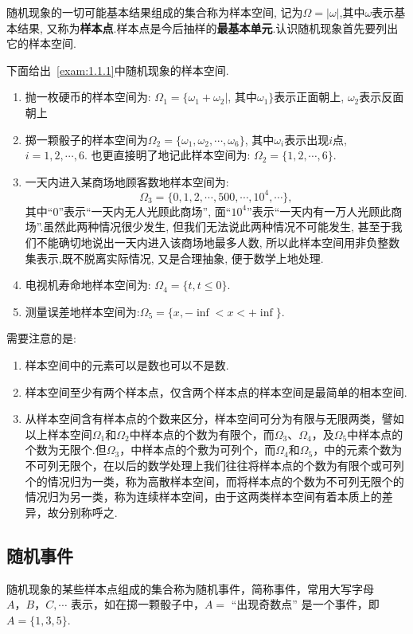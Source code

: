 随机现象的一切可能基本结果组成的集合称为样本空间, 记为$\Omega=|\omega|$,其中$\omega$表示基本结果, 又称为\textbf{样本点}.样本点是今后抽样的\textbf{最基本单元}.认识随机现象首先要列出它的样本空间.
	
\begin{example}
	
	下面给出~\ref{exam:1.1.1}中随机现象的样本空间.
	\begin{enumerate}
		\item 抛一枚硬币的样本空间为: $\Omega_1=\{\omega_{1}+\omega_{2}|$, 其中$\omega_{1}\}$表示正面朝上, $\omega_{2}$表示反面朝上
		\item 掷一颗骰子的样本空间为$ \Omega_{2}=\{\omega_{1},\omega_{2},\cdots,\omega_{6}\} $, 其中$ \omega_{i} $表示出现$ i $点, $ i=1,2,\cdots,6 $. 也更直接明了地记此样本空间为: $ \Omega_{2}=\{1,2,\cdots,6\} $.
		\item 一天内进入某商场地顾客数地样本空间为: 
		\[\Omega_{3}=\{0,1,2,\cdots,500,\cdots,10^4,\cdots\},\]
		其中“0”表示“一天内无人光顾此商场”, 面“$10^4$”表示“一天内有一万人光顾此商场”.虽然此两种情况很少发生, 但我们无法说此两种情况不可能发生, 甚至于我们不能确切地说出一天内进入该商场地最多人数, 所以此样本空间用非负整数集表示,既不脱离实际情况, 又是合理抽象, 便于数学上地处理.
		\item 电视机寿命地样本空间为: $ \Omega_{4}=\{t,t \leq 0\} $.
		\item 测量误差地样本空间为:$ \Omega_{5}=\{x,-\inf < x < +\inf\} $.
	\end{enumerate}
\end{example}   

需要注意的是:
\begin{enumerate}
	\item 样本空间中的元素可以是数也可以不是数.
	\item 样本空间至少有两个样本点，仅含两个样本点的样本空间是最简单的相本空间.
	\item 从样本空间含有样本点的个数来区分，样本空间可分为有限与无限两类，譬如以上样本空间$\Omega_1$和$\Omega_{2}$中样本点的个数为有限个，而$\Omega_3$、$\Omega_4$，及$\Omega_5$中样本点的个数为无限个.但$\Omega_3$，中样本点的个敷为可列个，而$\Omega_4$和$\Omega_5$，中的元素个数为不可列无限个，在以后的数学处理上我们往往将样本点的个数为有限个或可列个的情况归为一类，称为高散样本空间，而将样本点的个数为不可列无限个的情况归为另一类，称为连续样本空间，由于这两类样本空间有着本质上的差异，故分别称呼之.
\end{enumerate}

\subsection{随机事件}
随机现象的某些样本点组成的集合称为随机事件，简称事件，常用大写字母$A，B，C,\cdots$ 表示，如在掷一颗骰子中，$A=$ “出现奇数点” 是一个事件，即$A=\{1,3,5\}$.

